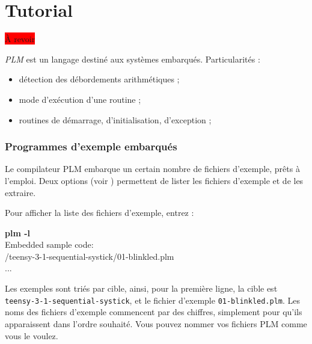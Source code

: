 

\chapter{Tutorial}

\thispagestyle{empty}

\colorbox{red}{À revoir}


\emph{PLM} est un langage destiné aux systèmes embarqués. Particularités :
\begin{itemize}
  \item détection des débordements arithmétiques ;
  \item mode d'exécution d'une routine ;
  \item routines de démarrage, d'initialisation, d'exception ;
\end{itemize}




\subsection{Programmes d'exemple embarqués}

Le compilateur PLM embarque un certain nombre de fichiers d'exemple, prêts à l'emploi. Deux options (voir ) permettent de lister les fichiers d'exemple et de les extraire.

Pour afficher la liste des fichiers d'exemple, entrez :

\begin{SHELL}
{\bfseries plm -l}\\
Embedded sample code:\\ 
\hspace*{1.2em}/teensy-3-1-sequential-systick/01-blinkled.plm\\
\hspace*{1.2em}...
\end{SHELL}

Les exemples sont triés par cible, ainsi, pour la première ligne, la cible est \texttt{teensy-3-1-sequential-systick}, et le fichier d'exemple \texttt{01-blinkled.plm}. Les noms des fichiers d'exemple commencent par des chiffres, simplement pour qu'ils apparaissent dans l'ordre souhaité. Vous pouvez nommer vos fichiers PLM comme vous le voulez.

